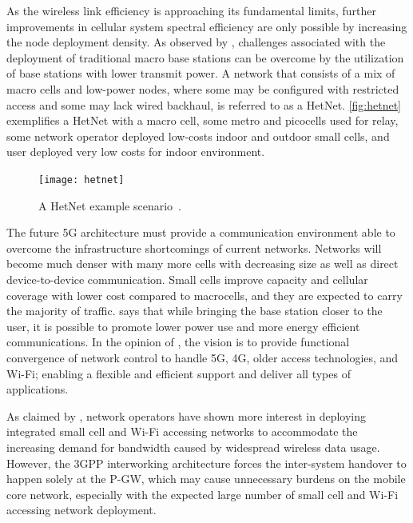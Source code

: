 As the wireless link efficiency is approaching its fundamental limits, further
improvements in cellular system spectral efficiency are only possible by
increasing the node deployment density. As observed by \citet{Damnjanovic2011},
challenges associated with the deployment of traditional macro base stations
can be overcome by the utilization of base stations with lower transmit power.
A network that consists of a mix of macro cells and low-power nodes, where some
may be configured with restricted access and some may lack wired backhaul, is
referred to as a \acf{HetNet}. \autoref{fig:hetnet} exemplifies a \ac{HetNet}
with a macro cell, some metro and picocells used for relay, some network
operator deployed low-costs indoor and outdoor small cells, and user deployed
very low costs for indoor environment.

\begin{figure}[htb]
  \centering
  \texttt{[image: hetnet]}
  \caption{A \acs{HetNet} example scenario~\cite{Qualcomm2014}.}
  \label{fig:hetnet}
\end{figure}

The future 5G architecture must provide a communication environment able to
overcome the infrastructure shortcomings of current networks. Networks will
become much denser with many more cells with decreasing size as well as direct
device-to-device communication. Small cells improve capacity and cellular
coverage with lower cost compared to macrocells, and they are expected to carry
the majority of traffic. \citet{Pierucci2015} says that while bringing the base
station closer to the user, it is possible to promote lower power use and more
energy efficient communications. In the opinion of \citet{Einsiedler2015}, the
vision is to provide functional convergence of network control to handle 5G,
4G, older access technologies, and Wi-Fi; enabling a flexible and efficient
support and deliver all types of applications.

As claimed by \citet{Tomici2015}, network operators have shown more interest in
deploying integrated small cell and Wi-Fi accessing networks to accommodate the
increasing demand for bandwidth caused by widespread wireless data usage.
However, the 3GPP interworking architecture forces the inter-system handover to
happen solely at the \ac{P-GW}, which may cause unnecessary burdens on the
mobile core network, especially with the expected large number of small cell
and Wi-Fi accessing network deployment.

